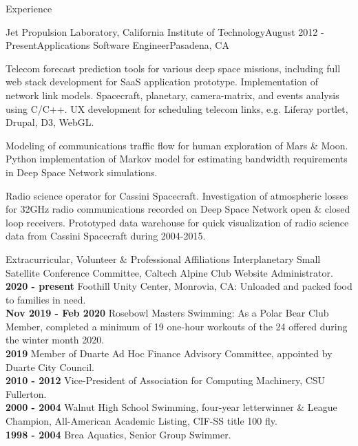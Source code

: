 \documentclass{resume} %
\begin{document}
\begin{rSection}{Experience}
\begin{rSubsection}{Jet Propulsion Laboratory, California Institute of Technology}{August 2012 - Present}{Applications Software Engineer}{Pasadena, CA}
\item Telecom forecast prediction tools for various deep space missions, including full web stack development for SaaS application prototype. Implementation of network link models. Spacecraft, planetary, camera-matrix, and events analysis using C/C++. UX development for scheduling telecom links, e.g. Liferay portlet, Drupal, D3, WebGL. 
\item Modeling of communications traffic flow for human exploration of Mars \& Moon. Python implementation of Markov model for estimating bandwidth requirements in Deep Space Network simulations. 
\item Radio science operator for Cassini Spacecraft. Investigation of atmospheric losses for 32GHz radio communications recorded on Deep Space Network open \& closed loop receivers. Prototyped data warehouse for quick visualization of radio science data from Cassini Spacecraft during 2004-2015. 
\end{rSubsection}




\begin{rSection}{ Extracurricular, Volunteer \& Professional Affiliations}
Interplanetary Small Satellite Conference Committee, Caltech Alpine Club Website Administrator.\\
{\bf 2020 - present} Foothill Unity Center, Monrovia, CA: Unloaded and packed food to families in need. \\
{\bf Nov 2019 - Feb 2020} Rosebowl Masters Swimming: As a Polar Bear Club Member, completed a minimum of 19 one-hour workouts of the 24 offered during the winter month 2020. \\
{\bf 2019} Member of Duarte Ad Hoc Finance Advisory Committee, appointed by Duarte City Council. \\
{\bf 2010 - 2012} Vice-President of Association for Computing Machinery, CSU Fullerton.\\
{\bf 2000 - 2004} Walnut High School Swimming, four-year letterwinner \& League Champion, All-American Academic Listing, CIF-SS title 100 fly. \\
{\bf 1998 - 2004} Brea Aquatics, Senior Group Swimmer.
 

\end{rSection}




\end{rSection}
\end{document}
